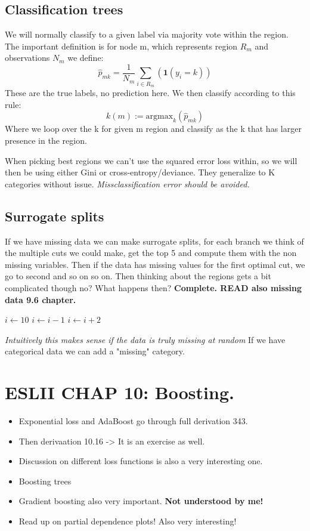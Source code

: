 \documentclass{article}
\begin{document}
\subsection{Classification trees}
We will normally classify to a given label via majority vote within the region.
The important definition is for node m, which represents region $R_m$ and observations $N_m$ we define: 
$$\hat{p}_{mk} = \frac{1}{N_m}\sum_{i \in R_m}(\textbf{1}(y_i = k))$$
These are the true labels, no prediction here.
We then classify according to this rule: $$k(m) := \textrm{argmax}_{k} (\hat{p}_{mk})$$
Where we loop over the k for given m region and classify as the k that has larger presence in the region.


When picking best regions we can't use the squared error loss within, so we will then be using either Gini or cross-entropy/deviance. They generalize to K categories without issue. \textit{ Missclassification error should be avoided.}  

\subsection{Surrogate splits}
If we have missing data we can make surrogate splits, for each branch we think of the multiple cuts we could make, get the top 5 and compute them with the non missing variables.
Then if the data has missing values for the first optimal cut, we go to second and so on so on. Then thinking about the regions gets a bit complicated though no? 
What happens then? \textbf{Complete. READ also missing data 9.6 chapter.}

\begin{algorithmic}
\State $i \gets 10$
    \State $i \gets i-1$
\Else
        \State $i \gets i+2$
    \EndIf
\EndIf 
\end{algorithmic}


\textit{Intuitively this makes sense if the data is truly missing at random}
If we have categorical data we can add a "missing" category.

\section{ESLII CHAP 10: Boosting.}
\begin{itemize}
    \item Exponential loss and AdaBoost go through full derivation 343.
    \item Then derivaation 10.16 -> It is an exercise as well.
    \item Discussion on different loss functions is also a very interesting one.
    \item Boosting trees 
    \item Gradient boosting also very important. \textbf{Not understood by me!}
    \item Read up on partial dependence plots! Also very interesting!
\end{itemize}
\end{document}
